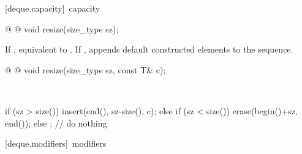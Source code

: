\documentclass[american,twoside]{book}
\begin{document}
[deque.capacity]{\ capacity}

%
\begin{itemdecl}
@  @
  void resize(size_type sz);
\end{itemdecl}

\begin{itemdescr}
\pnum
\effects If , equivalent to
. If ,
appends  default constructed elements to the
sequence.

\pnum
{}
\end{itemdescr}

%
\begin{itemdecl}
@ @ 
  void resize(size_type sz, const T& c);
\end{itemdecl}

\begin{itemdescr}
\pnum
\effects\ 
\begin{codeblock}
if (sz > size())
  insert(end(), sz-size(), c);
else if (sz < size())
  erase(begin()+sz, end());
else
  ;                 // do nothing
\end{codeblock}

\pnum
{}
\end{itemdescr}

[deque.modifiers]{\ modifiers}
\end{document}
